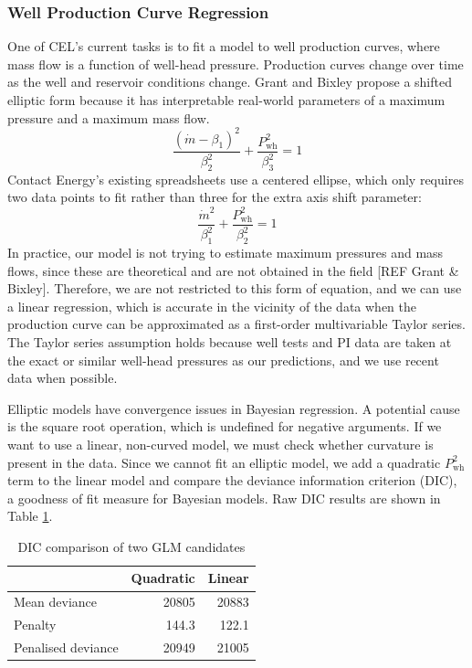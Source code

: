 \documentclass[a4paper, 12pt]{article}
\begin{document}
\subsubsection{Well Production Curve Regression}
One of CEL's current tasks is to fit a model to well production curves, where mass flow is a function of well-head pressure. Production curves change over time as the well and reservoir conditions change. Grant and Bixley propose a shifted elliptic form because it has interpretable real-world parameters of a maximum pressure and a maximum mass flow.
\begin{equation}
\frac{\left( \dot{m}-\beta_1 \right)^2}{\beta_2^2} + \frac{P_\text{wh}^2}{\beta_3^2} = 1
\end{equation}
Contact Energy's existing spreadsheets use a centered ellipse, which only requires two data points to fit rather than three for the extra axis shift parameter:
\begin{equation}
\frac{\dot{m}^2}{\beta_1^2} + \frac{P_\text{wh}^2}{\beta_2^2} = 1
\end{equation}
In practice, our model is not trying to estimate maximum pressures and mass flows, since these are theoretical and are not obtained in the field [REF Grant \& Bixley]. Therefore, we are not restricted to this form of equation, and we can use a linear regression, which is accurate in the vicinity of the data when the production curve can be approximated as a first-order multivariable Taylor series. The Taylor series assumption holds because well tests and PI data are taken at the exact or similar well-head pressures as our predictions, and we use recent data when possible.

Elliptic models have convergence issues in Bayesian regression. A potential cause is the square root operation, which is undefined for negative arguments. If we want to use a linear, non-curved model, we must check whether curvature is present in the data. Since we cannot fit an elliptic model, we add a quadratic $P_\text{wh}^2$ term to the linear model and compare the deviance information criterion (DIC), a goodness of fit measure for Bayesian models. Raw DIC results are shown in Table \ref{tab:curvature}.

\begin{table}[ht]
\centering
\begin{tabular}{lrr}
  \hline
& Quadratic & Linear \\ 
  \hline
Mean deviance & 20805 & 20883 \\
Penalty & 144.3 & 122.1 \\
Penalised deviance & 20949 & 21005\\
   \hline
\end{tabular}
\caption{DIC comparison of two GLM candidates} 
\label{tab:curvature}
\end{table}
\end{document}
